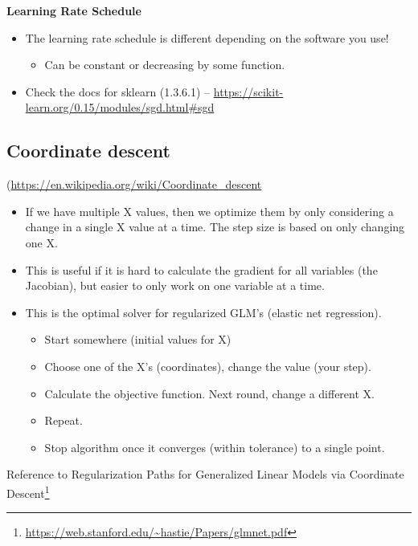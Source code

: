\documentclass[fontset=fandol,zihao=false,scheme=chinese,heading=true,UTF8]{ctexbook}
\providecommand{\tightlist}{%
  \setlength{\itemsep}{0pt}\setlength{\parskip}{0pt}}
\renewcommand{\href}[2]{#2\footnote{\url{#1}}}
\begin{document}
\textbf{Learning Rate Schedule}

\begin{itemize}
\tightlist
\item
  The learning rate schedule is different depending on the software you use!

  \begin{itemize}
  \tightlist
  \item
    Can be constant or decreasing by some function.
  \end{itemize}
\item
  Check the docs for sklearn (1.3.6.1) --
  \url{https://scikit-learn.org/0.15/modules/sgd.html\#sgd}
\end{itemize}

\hypertarget{coordinate-descent}{%
\subsection{Coordinate descent}\label{coordinate-descent}}

(\url{https://en.wikipedia.org/wiki/Coordinate_descent}

\begin{itemize}
\tightlist
\item
  If we have multiple X values, then we optimize them by only considering a change in a single X value at a time. The step size is based on only changing one X.
\item
  This is useful if it is hard to calculate the gradient for all variables (the Jacobian), but easier to only work on one variable at a time.
\item
  This is the optimal solver for regularized GLM's (elastic net regression).

  \begin{itemize}
  \tightlist
  \item
    Start somewhere (initial values for X)
  \item
    Choose one of the X's (coordinates), change the value (your step).
  \item
    Calculate the objective function. Next round, change a different X.
  \item
    Repeat.
  \item
    Stop algorithm once it converges (within tolerance) to a single point.
  \end{itemize}
\end{itemize}

Reference to \href{https://web.stanford.edu/~hastie/Papers/glmnet.pdf}{Regularization Paths for Generalized Linear Models via Coordinate Descent}
\end{document}
